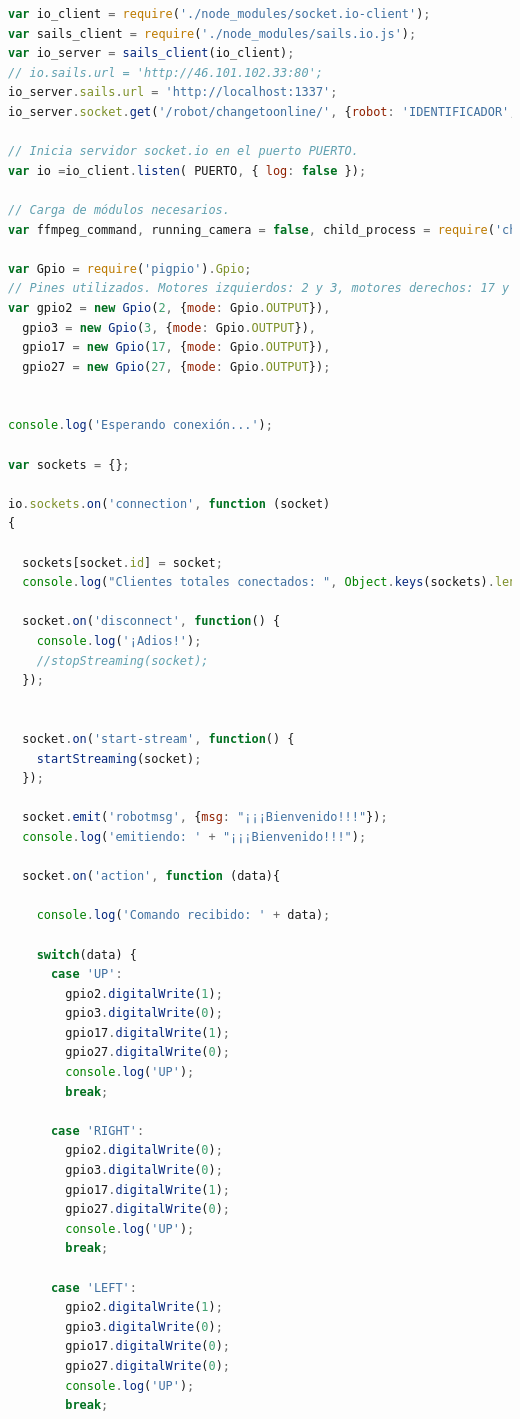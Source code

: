 \begin{lstlisting}[language=JavaScript]
var io_client = require('./node_modules/socket.io-client');
var sails_client = require('./node_modules/sails.io.js');
var io_server = sails_client(io_client);
// io.sails.url = 'http://46.101.102.33:80';
io_server.sails.url = 'http://localhost:1337';
io_server.socket.get('/robot/changetoonline/', {robot: 'IDENTIFICADOR', online: true});

// Inicia servidor socket.io en el puerto PUERTO.
var io =io_client.listen( PUERTO, { log: false });

// Carga de módulos necesarios.
var ffmpeg_command, running_camera = false, child_process = require('child_process');

var Gpio = require('pigpio').Gpio;
// Pines utilizados. Motores izquierdos: 2 y 3, motores derechos: 17 y 27
var gpio2 = new Gpio(2, {mode: Gpio.OUTPUT}),
  gpio3 = new Gpio(3, {mode: Gpio.OUTPUT}),
  gpio17 = new Gpio(17, {mode: Gpio.OUTPUT}),
  gpio27 = new Gpio(27, {mode: Gpio.OUTPUT});


console.log('Esperando conexión...');

var sockets = {};

io.sockets.on('connection', function (socket)
{

  sockets[socket.id] = socket;
  console.log("Clientes totales conectados: ", Object.keys(sockets).length);

  socket.on('disconnect', function() {
    console.log('¡Adios!');
    //stopStreaming(socket);
  });


  socket.on('start-stream', function() {
    startStreaming(socket);
  });

  socket.emit('robotmsg', {msg: "¡¡¡Bienvenido!!!"});
  console.log('emitiendo: ' + "¡¡¡Bienvenido!!!");

  socket.on('action', function (data){

    console.log('Comando recibido: ' + data);

    switch(data) {
      case 'UP':
        gpio2.digitalWrite(1);
        gpio3.digitalWrite(0);
        gpio17.digitalWrite(1);
        gpio27.digitalWrite(0);
        console.log('UP');
        break;

      case 'RIGHT':
        gpio2.digitalWrite(0);
        gpio3.digitalWrite(0);
        gpio17.digitalWrite(1);
        gpio27.digitalWrite(0);
        console.log('UP');
        break;

      case 'LEFT':
        gpio2.digitalWrite(1);
        gpio3.digitalWrite(0);
        gpio17.digitalWrite(0);
        gpio27.digitalWrite(0);
        console.log('UP');
        break;


\end{lstlisting}
